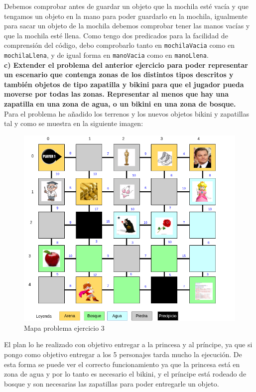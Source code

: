 \documentclass[12pt]{article}
\begin{document}
Debemos comprobar antes de guardar un objeto que la mochila esté vacía y que tengamos un objeto en la mano para poder guardarlo en la mochila, igualmente para sacar un objeto de la mochila debemos comprobar tener las manos vacías y que la mochila esté llena. Como tengo dos predicados para la facilidad de comprensión del código, debo comprobarlo tanto en \texttt{mochilaVacia} como en \texttt{mochilaLlena}, y de igual forma en \texttt{manoVacia} como en \texttt{manoLlena}.\\


\textbf{c) Extender el problema del anterior ejercicio para poder representar un escenario que contenga zonas de los distintos tipos descritos y también objetos de tipo zapatilla y bikini para que el jugador pueda moverse por todas las zonas. Representar al menos que hay una zapatilla en una zona de agua, o un bikini en una zona de bosque.}\\

Para el problema he añadido los terrenos y los nuevos objetos bikini y zapatillas tal y como se muestra en la siguiente imagen:


\begin{figure}[H] 
	\centering
	\includegraphics[width=15cm]{Ej3_1.png}
	\caption{Mapa problema ejercicio 3}
\end{figure}

El plan lo he realizado con objetivo entregar a la princesa y al príncipe, ya que si pongo como objetivo entregar a los 5 personajes tarda mucho la ejecución. De esta forma se puede ver el correcto funcionamiento ya que la princesa está en zona de agua y por lo tanto es necesario el bikini, y el príncipe está rodeado de bosque y son necesarias las zapatillas para poder entregarle un objeto.
\end{document}
